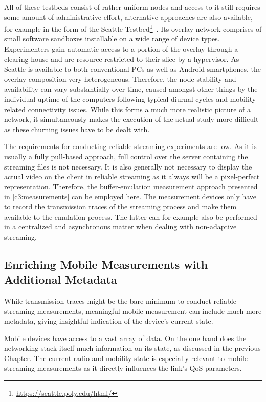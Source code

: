 All of these testbeds consist of rather uniform nodes and access to it still requires some amount of administrative effort, alternative approaches are also available, for example in the form of the Seattle Testbed\footnote{\url{https://seattle.poly.edu/html/}}~\cite{Cappos:2009:SPE:1508865.1508905}. Its overlay network comprises of small software sandboxes installable on a wide range of device types. Experimenters gain automatic access to a portion of the overlay through a clearing house and are resource-restricted to their slice by a hypervisor. As Seattle is available to both conventional PCs as well as Android smartphones, the overlay composition very heterogeneous. Therefore, the node stability and availability can vary substantially over time, caused amongst other things by the individual uptime of the computers following typical diurnal cycles and mobility-related connectivity issues.
While this forms a much more realistic picture of a network, it simultaneously makes the execution of the actual study more difficult as these churning issues have to be dealt with.

The requirements for conducting reliable streaming experiments are low. As it is usually a fully pull-based approach, full control over the server containing the streaming files is not necessary. It is also generally not necessary to display the actual video on the client in reliable streaming as it always will be a pixel-perfect representation. Therefore, the buffer-emulation measurement approach presented in \ref{c3:measurements} can be employed here. The measurement devices only have to record the transmission traces of the streaming process and make them available to the emulation process. The latter can for example also be performed in a centralized and asynchronous matter when dealing with non-adaptive streaming.


\subsection{Enriching Mobile Measurements with Additional Metadata}
\label{c6:sensorium}

While transmission traces might be the bare minimum to conduct reliable streaming measurements, meaningful mobile measurement can include much more metadata, giving insightful indication of the device's current state.

Mobile devices have access to a vast array of data. On the one hand does the networking stack itself much information on its state, as discussed in the previous Chapter. The current radio and mobility state is especially relevant to mobile streaming measurements as it directly influences the link's \gls{QoS} parameters. 

